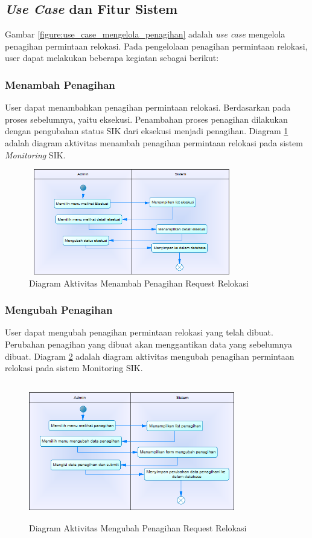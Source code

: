 \subsection{\textit{Use Case} dan Fitur Sistem}
Gambar \ref{figure:use_case_mengelola_penagihan} adalah \textit{use case} mengelola penagihan permintaan relokasi. Pada pengelolaan penagihan permintaan relokasi, user dapat melakukan beberapa kegiatan sebagai berikut:
	\subsubsection{Menambah Penagihan}
	User dapat menambahkan penagihan permintaan relokasi. Berdasarkan pada proses sebelumnya, yaitu eksekusi. Penambahan proses penagihan dilakukan dengan pengubahan status SIK dari eksekusi menjadi penagihan. Diagram \ref{figure:activity_menambah_penagihan} adalah diagram aktivitas menambah penagihan permintaan relokasi pada sistem \textit{Monitoring} SIK.
	\begin{figure}[h]
	\centerline {\includegraphics[width=9cm,height=4.6cm]{bab4/ActivityDiagram_MenambahkanPenagihan.png}}
	\caption{Diagram Aktivitas Menambah Penagihan Request Relokasi}
	\label{figure:activity_menambah_penagihan}
	\end{figure}
	\subsubsection{Mengubah Penagihan}
	User dapat mengubah penagihan permintaan relokasi yang telah dibuat. Perubahan penagihan yang dibuat akan menggantikan data yang sebelumnya dibuat. Diagram \ref{figure:activity_mengubah_penagihan} adalah diagram aktivitas mengubah penagihan permintaan relokasi pada sistem Monitoring SIK.
	\begin{figure}[h]
	\centerline {\includegraphics[width=9cm,height=6cm]{bab4/ActivityDiagram_MengubahPenagihan.png}}
	\caption{Diagram Aktivitas Mengubah Penagihan Request Relokasi}
	\label{figure:activity_mengubah_penagihan}
	\end{figure}
	
